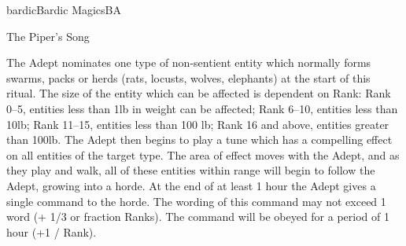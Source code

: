 \begin{college}[2.1]{bardic}{Bardic Magics}{BA}
\begin{ritual}[R-4]{The Piper's Song}
\begin{effects}
The Adept nominates one type of non-sentient entity which normally
forms swarms, packs or herds (\eg rats, locusts, wolves, elephants) at
the start of this ritual. The size of the entity which can be affected
is dependent on Rank: Rank 0--5, entities less than 1lb in weight can
be affected; Rank 6--10, entities less than 10lb; Rank 11--15,
entities less than 100 lb; Rank 16 and above, entities greater than
100lb. The Adept then begins to play a tune which has a compelling
effect on all entities of the target type. The area of effect moves
with the Adept, and as they play and walk, all of these entities
within range will begin to follow the Adept, growing into a horde. At
the end of at least 1 hour the Adept gives a single command to the
horde. The wording of this command may not exceed 1 word (+ 1/3 or
fraction Ranks). The command will be obeyed for a period of 1 hour (+1
/ Rank).
\end{effects}
\end{ritual}
\end{college}
